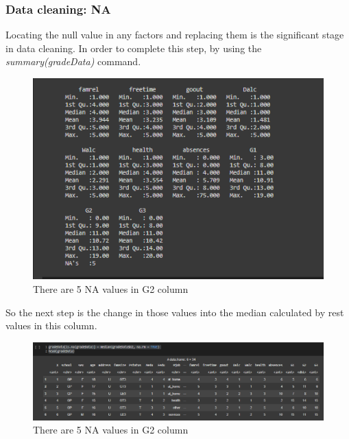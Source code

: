 \documentclass[a4paper]{article}
\begin{document}
\subsubsection{Data cleaning: NA} 
\vspace{0.4cm}
Locating the null value in any factors and replacing them is the significant stage in data cleaning. In order to complete this step, by using the \textit{summary(gradeData)} command.
\begin{figure}[H]
    \centering
    \includegraphics[scale = 1]{Images/2.PNG}
    \caption{There are 5 NA values in G2 column}
    \label{fig:summary}
\end{figure}
So the next step is the change in those values into the median calculated by rest values in this column.
\begin{figure}[H]
    \centering
    \includegraphics[scale = 1]{Images/3.PNG}
    \caption{There are 5 NA values in G2 column}
    \label{fig:summary}
\end{figure}

\end{document}
